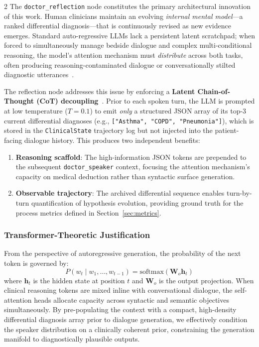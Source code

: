 \documentclass[10pt, a4paper]{article}
\begin{document}
\begin{multicols}{2}
The \texttt{doctor\_reflection} node constitutes the primary architectural innovation of this work. Human clinicians maintain an evolving \textit{internal mental model}—a ranked differential diagnosis—that is continuously revised as new evidence emerges. Standard auto-regressive LLMs lack a persistent latent scratchpad; when forced to simultaneously manage bedside dialogue and complex multi-conditional reasoning, the model's attention mechanism must \textit{distribute} across both tasks, often producing reasoning-contaminated dialogue or conversationally stilted diagnostic utterances~\cite{wei2022chain}.

The reflection node addresses this issue by enforcing a \textbf{Latent Chain-of-Thought (CoT) decoupling}~\cite{wei2022chain}. Prior to each spoken turn, the LLM is prompted at low temperature ($T = 0.1$) to emit \textit{only} a structured JSON array of its top-3 current differential diagnoses (e.g., \texttt{["Asthma",\,"COPD",\,"Pneumonia"]}), which is stored in the \texttt{ClinicalState} trajectory log but not injected into the patient-facing dialogue history. This produces two independent benefits:

\begin{enumerate}[leftmargin=*, itemsep=2pt]
    \item \textbf{Reasoning scaffold}: The high-information JSON tokens are prepended to the subsequent \texttt{doctor\_speaker} context, focusing the attention mechanism's capacity on medical deduction rather than syntactic surface generation.
    \item \textbf{Observable trajectory}: The archived differential sequence enables turn-by-turn quantification of hypothesis evolution, providing ground truth for the process metrics defined in Section~\ref{sec:metrics}.
\end{enumerate}

\subsubsection{Transformer-Theoretic Justification}

From the perspective of autoregressive generation, the probability of the next token is governed by:
\begin{equation}
    P(w_t \mid w_1, \ldots, w_{t-1}) = \text{softmax}(\mathbf{W}_o \mathbf{h}_t)
\end{equation}
where $\mathbf{h}_t$ is the hidden state at position $t$ and $\mathbf{W}_o$ is the output projection. When clinical reasoning tokens are mixed inline with conversational dialogue, the self-attention heads allocate capacity across syntactic and semantic objectives simultaneously. By pre-populating the context with a compact, high-density differential diagnosis array prior to dialogue generation, we effectively condition the speaker distribution on a clinically coherent prior, constraining the generation manifold to diagnostically plausible outputs.


\end{multicols}
\end{document}
